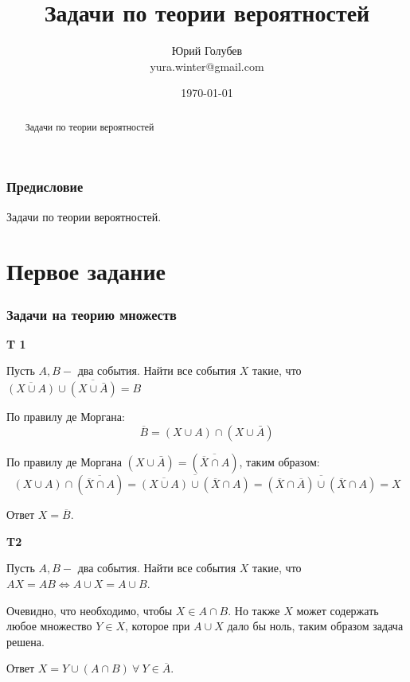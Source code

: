 \documentclass[a4paper,12pt]{article} %
\author{Юрий Голубев\\ yura.winter@gmail.com }
\title{Задачи по теории вероятностей}
\date{\today}
\begin{document}
\maketitle

\begin{abstract}
Задачи по теории вероятностей
\end{abstract}
\tableofcontents

\section*{Предисловие}

Задачи по теории вероятностей.





\clearpage
\part{Первое задание}


\section{Задачи на теорию множеств}

\begin{example}\textbf{T 1}


Пусть $A, B-$ два события. Найти все события $X$ такие, что 
$\overline{(X \cup A)} \cup \overline{(X \cup \bar{A})}=B$

По правилу де Моргана: 
$$
\overline{B}=
(X \cup A) \cap (X \cup \bar{A})
$$

По правилу де Моргана $(X \cup \bar{A})= (\overline{\overline{X} \cap A})$, таким образом:
$$
(X \cup A) \cap (\overline{\overline{X} \cap A}) =
\overline{\overline{(X \cup A)} \cup (\overline{X} \cap A) }=
\overline{(\overline{X} \cap \overline{A}) \cup (\overline{X} \cap A)}= X
$$


Ответ $ X=\overline{B}$.

\end{example}


\begin{example}\textbf{T2}

Пусть $A, B-$ два события. Найти все события $X$ такие, что $A X=A B \Longleftrightarrow  A \cup X=A \cup B$.

Очевидно, что необходимо, чтобы $X\in A\cap B$. Но также $X$ может содержать любое множество $ Y\in X $, которое при $A \cup X$ дало бы ноль, таким образом задача решена.

Ответ $ X=Y \cup (A\cap B)  \ \forall \ Y\in \overline{A}$.


\end{example}
\end{document}
